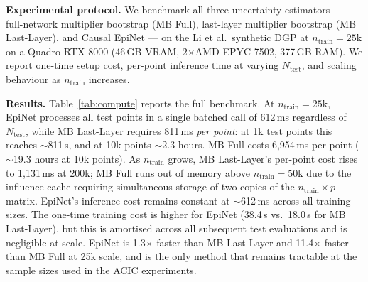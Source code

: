 \documentclass[accepted]{uai2026} %
\theoremstyle{plain}
\theoremstyle{definition}
\theoremstyle{remark}
\begin{document}
\textbf{Experimental protocol.} We benchmark all three uncertainty estimators —
full-network multiplier bootstrap (MB Full), last-layer multiplier bootstrap (MB
Last-Layer), and Causal EpiNet — on the Li et al.\ synthetic DGP at
$n_\mathrm{train} = 25\mathrm{k}$ on a Quadro RTX 8000 (46\,GB VRAM, 2$\times$AMD
EPYC 7502, 377\,GB RAM). We report one-time setup cost, per-point inference time at
varying $N_\mathrm{test}$, and scaling behaviour as $n_\mathrm{train}$ increases.

\textbf{Results.} Table~\ref{tab:compute} reports the full benchmark. At
$n_\mathrm{train} = 25\mathrm{k}$, EpiNet processes all test points in a single
batched call of 612\,ms regardless of $N_\mathrm{test}$, while MB Last-Layer requires
811\,ms \emph{per point}: at 1k test points this reaches $\sim$811\,s, and at 10k
points $\sim$2.3 hours. MB Full costs 6,954\,ms per point ($\sim$19.3 hours at 10k
points). As $n_\mathrm{train}$ grows, MB Last-Layer's per-point cost rises to
1,131\,ms at 200k; MB Full runs out of memory above $n_\mathrm{train} = 50\mathrm{k}$
due to the influence cache requiring simultaneous storage of two copies of the
$n_\mathrm{train} \times p$ matrix. EpiNet's inference cost remains constant at
$\sim$612\,ms across all training sizes. The one-time training cost is higher for
EpiNet (38.4\,s vs.\ 18.0\,s for MB Last-Layer), but this is amortised across all
subsequent test evaluations and is negligible at scale. EpiNet is 1.3$\times$ faster
than MB Last-Layer and 11.4$\times$ faster than MB Full at 25k scale, and is the only
method that remains tractable at the sample sizes used in the ACIC experiments.
\end{document}
